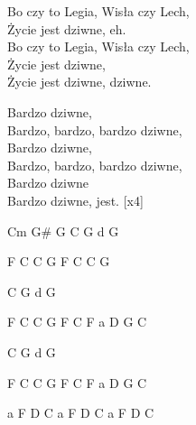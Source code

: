 \begin{text}
Bo czy to Legia, Wisła czy Lech,\\
Życie jest dziwne, eh.\\
Bo czy to Legia, Wisła czy Lech,\\
Życie jest dziwne,\\
Życie jest dziwne, dziwne.

Bardzo dziwne,\\
Bardzo, bardzo, bardzo dziwne,\\
Bardzo dziwne,\\
Bardzo, bardzo, bardzo dziwne,\\
Bardzo dziwne\\
Bardzo dziwne, jest. [x4]
\end{text}
\begin{chord}
Cm G\# G
C
G
d
G

F C
C G
F C
C G

C
G
d
G

F C
C G
F C
F a D G C

C
G
d
G

F C
C G
F C
F a D G C

a
F D C
a
F D C
a
F D C
\end{chord}
